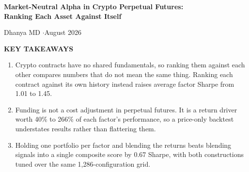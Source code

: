 \documentclass[12pt]{article}
\begin{document}
\begin{center}
{\large\bfseries Market-Neutral Alpha in Crypto Perpetual Futures:\\
Ranking Each Asset Against Itself}

\vspace{6pt}
Dhanya MD \quad$\cdot$\quad August 2026

\vspace{18pt}
{\bfseries KEY TAKEAWAYS}
\end{center}

\vspace{6pt}

\begin{enumerate}\setlength{\itemsep}{16pt}

\item Crypto contracts have no shared fundamentals, so ranking them against each
other compares numbers that do not mean the same thing. Ranking each contract
against its own history instead raises average factor Sharpe from 1.01 to 1.45.

\item Funding is not a cost adjustment in perpetual futures. It is a return
driver worth 40\% to 266\% of each factor's performance, so a price-only backtest
understates results rather than flattering them.

\item Holding one portfolio per factor and blending the returns beats blending
signals into a single composite score by 0.67 Sharpe, with both constructions
tuned over the same 1,286-configuration grid.

\end{enumerate}
\end{document}
